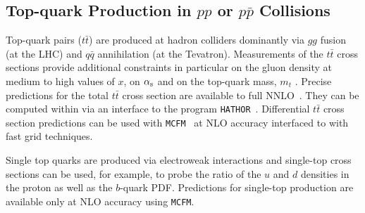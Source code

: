 \subsection{Top-quark Production in $pp$ or $p \bar p$ Collisions}

Top-quark pairs ($t \bar t$) are produced at hadron colliders dominantly via $gg$ fusion (at the LHC) and $q\bar{q}$ annihilation (at the Tevatron). Measurements of the $t \bar t$ cross sections provide additional 
constraints in particular on the gluon density at medium to high values of $x$, 
on $\alpha_\mathrm{s}$ and on the top-quark mass, $m_t$ \cite{cms:top}. 
Precise predictions for the total $t \bar t$ cross section are available 
to full NNLO~\cite{Czakon:2013goa}. They can be computed within \fitter via an interface 
to the program \texttt{HATHOR}~\cite{Aliev:2010zk}. Differential $t \bar t$ cross section
predictions can be used with
\texttt{MCFM}~\cite{Campbell:2010ff,Campbell:2009ss,Campbell:2005bb,Campbell:2004ch,Campbell:2012uf} 
at NLO accuracy interfaced to \fitter with fast grid techniques.

Single top quarks are produced via electroweak interactions and single-top cross sections 
can be used, for example, to probe the ratio of the $u$ and $d$ densities in the proton 
as well as the $b$-quark PDF. Predictions 
for single-top production are available only at NLO accuracy using \texttt{MCFM}.


%
